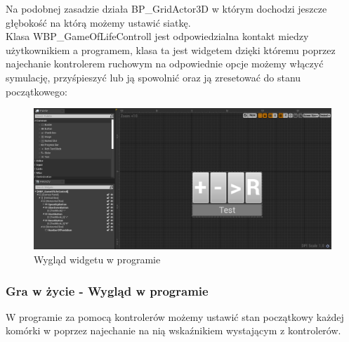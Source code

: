 \documentclass[a4paper,12pt,reqno]{article}
\begin{document}
Na podobnej zasadzie działa BP\_GridActor3D w którym dochodzi jeszcze głębokość na którą możemy ustawić siatkę.\\

Klasa WBP\_GameOfLifeControll jest odpowiedzialna kontakt miedzy użytkownikiem a programem, klasa ta jest widgetem dzięki któremu poprzez najechanie kontrolerem ruchowym na odpowiednie opcje możemy włączyć symulację, przyśpieszyć lub ją spowolnić oraz ją zresetować do stanu początkowego:

\begin{figure}[H]%
\centering
\includegraphics[width=0.7\columnwidth]{graphics/gameoflife/GameOfLifeControllInUE_1.png}
\caption{Wygląd widgetu w programie
\label{BPExample}}%
%
\qquad
\end{figure}  

\subsubsection{Gra w życie - Wygląd w programie}
W programie za pomocą kontrolerów możemy ustawić stan początkowy każdej komórki w poprzez najechanie na nią wskaźnikiem wystającym z kontrolerów.
\end{document}
